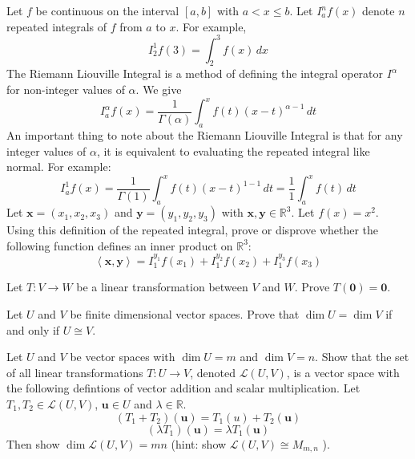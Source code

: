 \documentclass[12pt, letterpaper]{article}
\begin{document}
\begin{exercise}\label{7}
    Let \(f\) be continuous on the interval \([a,b]\) with \(a<x\leq b\). Let \(I_a^n f(x)\) denote \(n\) repeated integrals of \(f\) from \(a\) to \(x\). For example,
    \[
        I_2^1 f(3)=\int_2^3 f(x)\,dx
    \]
    The Riemann Liouville Integral is a method of defining the integral operator \(I^\alpha \) for non-integer values of \(\alpha \). We give
    \[
        I_a^\alpha f(x)=\frac{1}{\Gamma (\alpha )}\int_a^x f(t)\left( x-t \right)^{\alpha -1} \,dt
    \]
    An important thing to note about the Riemann Liouville Integral is that for any integer values of \(\alpha \), it is equivalent to evaluating the repeated integral like normal. For example:
    \[
        I_a^1 f(x) = \frac{1}{\Gamma (1)}\int_a^x f(t)(x-t)^{1-1}\,dt = \frac{1}{1}\int_a^x f(t)\,dt
    \]
    Let \(\mathbf{x}=\left(x_1,x_2,x_3\right)\) and \(\mathbf{y}=\left( y_1,y_2,y_3 \right) \) with \(\mathbf{x},\mathbf{y}\in\mathbb{R}^3\). Let \(f(x)=x^2\). Using this definition of the repeated integral, prove or disprove whether the following function defines an inner product on \(\mathbb{R}^3\):
    \[
        \left\langle \mathbf{x},\mathbf{y} \right\rangle =I_1^{y_1}f \left( x_1 \right) +I_1^{y_2}f \left( x_2 \right) +I_1^{y_3}f \left( x_3 \right)
    \]
\end{exercise}
\begin{exercise}\label{8}
    Let \(T:V\to W\) be a linear transformation between \(V\) and \(W\). Prove \(T(\mathbf{0})=\mathbf{0}\).
\end{exercise}
\begin{exercise}[Isomorphisms]\label{9}
    Let \(U\) and \(V\) be finite dimensional vector spaces. Prove that \(\dim U=\dim V\) if and only if \(U\cong V\).
\end{exercise}
\begin{exercise}[CHALLENGE]
    Let \(U\) and \(V\) be vector spaces with \(\dim U=m\) and \(\dim V=n\). Show that the set of all linear transformations \(T:U\to V\), denoted \(\mathcal{L} (U,V)\), is a vector space with the following defintions of vector addition and scalar multiplication. Let \(T_1,T_2\in \mathcal{L} (U,V)\), \(\mathbf{u}\in U\) and \(\lambda \in \mathbb{R}\).
    \[
        (T_1 +T_2)(\mathbf{u})=T_1 (u)+T_2 (\mathbf{u})
    \]
    \[
        (\lambda T_1)(\mathbf{u})=\lambda T_1(\mathbf{u})
    \]
    Then show \(\dim \mathcal{L} (U,V)=mn\) (hint: show \(\mathcal{L} (U,V)\cong M_{m,n}\) ).
\end{exercise}
\end{document}
